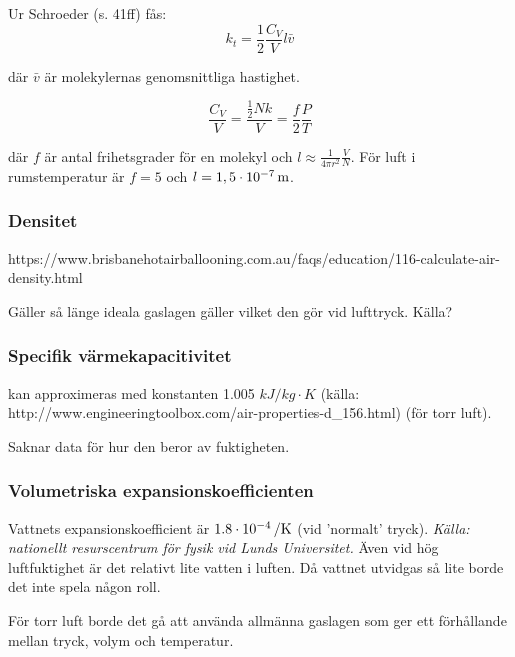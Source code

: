 Ur Schroeder (s. 41ff) fås:
\begin{equation}
k_t=\frac{1}{2}\frac{C_V}{V} l \bar{v}
\end{equation}

där $\bar{v}$ är molekylernas genomsnittliga hastighet.

\begin{equation}
\frac{C_V}{V}=\frac{\tfrac{1}{2}Nk}{V}=\frac{f}{2}\frac{P}{T}
\end{equation}

där $f$ är antal frihetsgrader för en molekyl och $l\approx\frac{1}{4\pi r^2}\frac{V}{N}$. För luft i rumstemperatur är $f=5$ och $l=\unit[1,5\cdot 10^{-7}]{m}$.



\subsubsection{Densitet} %
\label{sec:densitet}

https://www.brisbanehotairballooning.com.au/faqs/education/116-calculate-air-density.html

Gäller så länge ideala gaslagen gäller vilket den gör vid lufttryck. Källa?


\subsubsection{Specifik värmekapacitivitet}
kan approximeras med konstanten 1.005 $kJ/kg\cdot K$ (källa: http://www.engineeringtoolbox.com/air-properties-d\_156.html) (för torr luft).

Saknar data för hur den beror av fuktigheten.


\subsubsection{Volumetriska expansionskoefficienten} %
Vattnets expansionskoefficient är $\unit[1.8\cdot 10^{-4}]{/K}$ (vid 'normalt' tryck). \emph{Källa: nationellt resurscentrum för fysik vid Lunds Universitet.} Även vid hög luftfuktighet är det relativt lite vatten i luften. Då vattnet utvidgas så lite borde det inte spela någon roll.

För torr luft borde det gå att använda allmänna gaslagen som ger ett förhållande mellan tryck, volym och temperatur.


